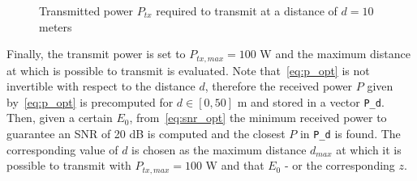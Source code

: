 \documentclass[10pt]{article}
\begin{document}
\begin{figure}[h!]
	\centering
	\caption{Transmitted power $P_{tx}$ required to transmit at a distance of $d = 10$ meters}
	\label{fig:ptx}
\end{figure}

\clearpage

Finally, the transmit power is set to $P_{tx, max} = 100$ W and the maximum distance at which is possible to transmit is evaluated. Note that~\eqref{eq:p_opt} is not invertible with respect to the distance $d$, therefore the received power $P$ given by~\eqref{eq:p_opt} is precomputed for $d \in [0, 50]$ m and stored in a vector \texttt{P\_d}. Then, given a certain $E_0$, from~\eqref{eq:snr_opt} the minimum received power to guarantee an SNR of 20 dB is computed and the closest $P$ in \texttt{P\_d} is found. The corresponding value of $d$ is chosen as the maximum distance $d_{max}$ at which it is possible to transmit with $P_{tx, max} = 100$ W and that $E_0$ - or the corresponding $z$.
\end{document}
